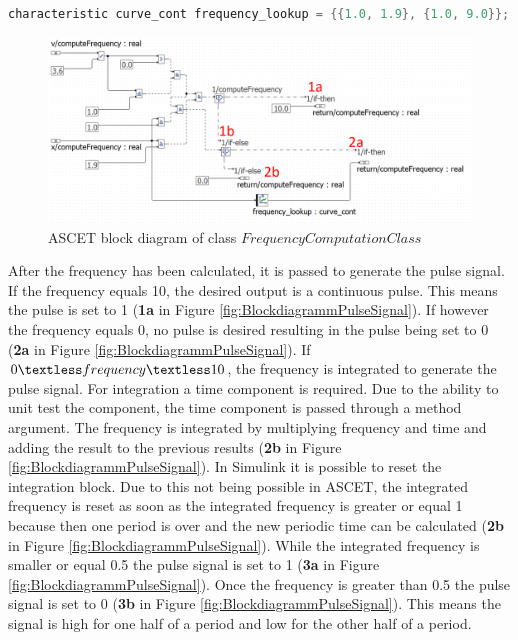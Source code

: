 \begin{lstlisting}[language=Java,basicstyle=\scriptsize, caption= ASCET frequency lookup table,label= lst:D8_lookup]
characteristic curve_cont frequency_lookup = {{1.0, 1.9}, {1.0, 9.0}};
\end{lstlisting}

\begin{figure}[H]
\centering
\includegraphics[width=1\textwidth]{images/Blockdiagramm_FrequencyComputationClassAnno.png}
\caption{ASCET block diagram of class $FrequencyComputationClass$}
\label{fig:BlockdiagrammFrequencyComputationClass}
\end{figure}

After the frequency has been calculated, it is passed to generate the pulse signal. If the frequency equals 10, the desired output is a continuous pulse. This means the pulse is set to 1 (\textbf{1a} in Figure \ref{fig:BlockdiagrammPulseSignal}). If however the frequency equals 0, no pulse is desired resulting in the pulse being set to 0 (\textbf{2a} in Figure \ref{fig:BlockdiagrammPulseSignal}). If $0 \textless frequency \textless 10$, the frequency is integrated to generate the pulse signal. For integration a time component is required. Due to the ability to unit test the component, the time component is passed through a method argument. The frequency is integrated by multiplying frequency and time and adding the result to the previous results (\textbf{2b} in Figure \ref{fig:BlockdiagrammPulseSignal}). In Simulink it is possible to reset the integration block. Due to this not being possible in ASCET, the integrated frequency is reset as soon as the integrated frequency is greater or equal 1 because then one period is over and the new periodic time can be calculated (\textbf{2b} in Figure \ref{fig:BlockdiagrammPulseSignal}).  
While the integrated frequency is smaller or equal 0.5 the pulse signal is set to 1 (\textbf{3a} in Figure \ref{fig:BlockdiagrammPulseSignal}). Once the frequency is greater than 0.5 the pulse signal is set to 0 (\textbf{3b} in Figure \ref{fig:BlockdiagrammPulseSignal}). This means the signal is high for one half of a period and low for the other half of a period.

